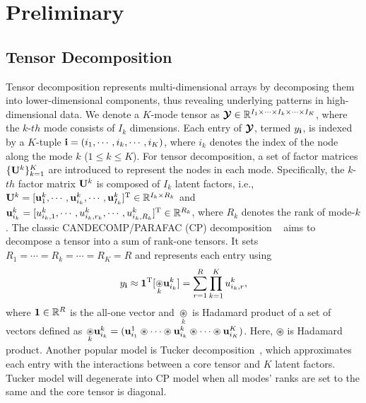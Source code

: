 \section{Preliminary}
\subsection{Tensor Decomposition}
Tensor decomposition   represents multi-dimensional arrays  by decomposing them into  lower-dimensional components, thus revealing underlying patterns in high-dimensional data. We denote a $K$-mode tensor as $\mbox{\boldmath $\mathcal{Y}$} \in \mathbb{R}^{I_1\times \cdots \times I_k  \times \cdots \times I_K}$, where the $k$-$th$ mode  consists of $I_k$ dimensions. Each entry of $\mbox{\boldmath $\mathcal{Y}$}$, termed $y_{\mathbf{i}}$, is indexed by a $K$-tuple $\mathbf{i}=(i_1,\cdots,i_k, \cdots, i_K)$, where $i_k$ denotes the index of the node along the mode $k$ ($1\le k \le K$). 
For tensor decomposition,  a set of  factor matrices $\{\mathbf{U}^{k}\}_{k=1}^{K}$ are introduced to represent the nodes in each mode. Specifically, the $k$-$th$ factor matrix $\mathbf{U}^{k}$ is composed of $I_k$ latent factors, i.e., $\mathbf{U}^{k}=[\mathbf{u}^{k}_{1}, \cdots, \mathbf{u}^{k}_{i_k}, \cdots,\mathbf{u}^{k}_{I_k}]^{\mathrm{T}} \in \mathbb{R}^{I_k \times R_k}$ and $\mathbf{u}^{k}_{i_k} = [u_{i_k,1}^{k}, \cdots, u_{i_k,r_k}^{k}, \cdots, u_{i_k,R_k}^{k}]^{\mathrm{T}} \in \mathbb{R}^{R_k}$, where $R_k$ denotes  the  rank of mode-$k$.
The classic CANDECOMP/PARAFAC (CP) decomposition ~\citep{HarshmanCP} aims to decompose a tensor into a sum of rank-one tensors. It sets $R_1 = \cdots = R_k =\cdots = R_K = R$ and represents each entry using 
\vspace{-2mm}
\begin{equation}
    y_{\mathbf{i}} \approx \boldsymbol{1}^{\mathrm{T}}[\underset{k}{\circledast} 
\mathbf{u}_{i_k}^k]=\sum_{r=1}^{R}\prod_{k=1}^{K}u^{k}_{i_k, r},
 \label{eq:CP}
\end{equation}
 where $\boldsymbol{1} \in \mathbb{R}^{R}$ is the all-one vector and 
 $\underset{k}{\circledast} $ is   Hadamard product of a set of vectors  defined as  $\underset{k}{\circledast}\mathbf{u}_{i_k}^k = (\mathbf{u}^{1}_{i_1} \circledast \cdots \circledast \mathbf{u}^{k}_{i_k} \circledast  \cdots \circledast \mathbf{u}^{K}_{i_K})$. Here,  $\circledast$ is  Hadamard product.
Another popular model is  Tucker decomposition~\citep{sidiropoulos2017tensor}, which approximates each entry with the interactions between a core tensor and $K$ latent factors. Tucker model will degenerate into  CP model when all modes' ranks are set to the same and the core tensor is diagonal.

